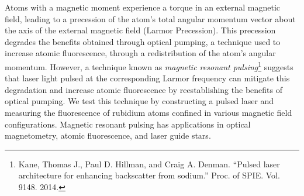 Atoms with a magnetic moment experience a torque in an external magnetic field, leading to a precession of the atom's total angular momentum vector about the axis of the external magnetic field (Larmor Precession). This precession degrades the benefits obtained through optical pumping, a technique used to increase atomic fluorescence, through a redistribution of the atom's angular momentum. However, a technique known as \textit{magnetic resonant pulsing}\footnote{Kane, Thomas J., Paul D. Hillman, and Craig A. Denman. ``Pulsed laser architecture for enhancing backscatter from sodium.'' Proc. of SPIE. Vol. 9148. 2014.} suggests that laser light pulsed at the corresponding Larmor frequency can mitigate this degradation and increase atomic fluorescence by reestablishing the benefits of optical pumping. We test this technique by constructing a pulsed laser and measuring the fluorescence of rubidium atoms confined in various magnetic field configurations. Magnetic resonant pulsing has applications in optical magnetometry, atomic fluorescence, and laser guide stars.

